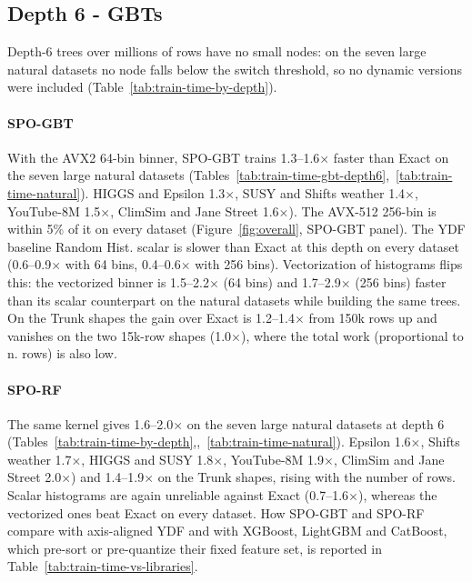 \documentclass[sigconf]{acmart}%
\begin{document}
\subsection{Depth 6 - GBTs}
\label{sec:res-depth6}




Depth-6 trees over millions of rows have no small nodes: on the seven large natural datasets no node falls below the switch threshold, so no dynamic versions were included (Table~\ref{tab:train-time-by-depth}).

\paragraph{SPO-GBT} With the AVX2 64-bin binner, SPO-GBT trains 1.3--1.6$\times$ faster than Exact on the seven large natural datasets (Tables~\ref{tab:train-time-gbt-depth6},~\ref{tab:train-time-natural}). HIGGS and Epsilon 1.3$\times$, SUSY and Shifts weather 1.4$\times$, YouTube-8M 1.5$\times$, ClimSim and Jane Street 1.6$\times$). The AVX-512 256-bin is within 5\% of it on every dataset (Figure~\ref{fig:overall}, SPO-GBT panel). The YDF baseline Random Hist. scalar is slower than Exact at this depth on every dataset (0.6--0.9$\times$ with 64 bins, 0.4--0.6$\times$ with 256 bins). Vectorization of histograms flips this: the vectorized binner is 1.5--2.2$\times$ (64 bins) and 1.7--2.9$\times$ (256 bins) faster than its scalar counterpart on the natural datasets while building the same trees. On the Trunk shapes the gain over Exact is 1.2--1.4$\times$ from 150k rows up and vanishes on the two 15k-row shapes (1.0$\times$), where the total work (proportional to n. rows) is also low.

\paragraph{SPO-RF} The same kernel gives 1.6--2.0$\times$ on the seven large natural datasets at depth 6 (Tables~\ref{tab:train-time-by-depth},,~\ref{tab:train-time-natural}). Epsilon 1.6$\times$, Shifts weather 1.7$\times$, HIGGS and SUSY 1.8$\times$, YouTube-8M 1.9$\times$, ClimSim and Jane Street 2.0$\times$) and 1.4--1.9$\times$ on the Trunk shapes, rising with the number of rows. Scalar histograms are again unreliable against Exact (0.7--1.6$\times$), whereas the vectorized ones beat Exact on every dataset. How SPO-GBT and SPO-RF compare with axis-aligned YDF and with XGBoost, LightGBM and CatBoost, which pre-sort or pre-quantize their fixed feature set, is reported in Table~\ref{tab:train-time-vs-libraries}.
\end{document}

